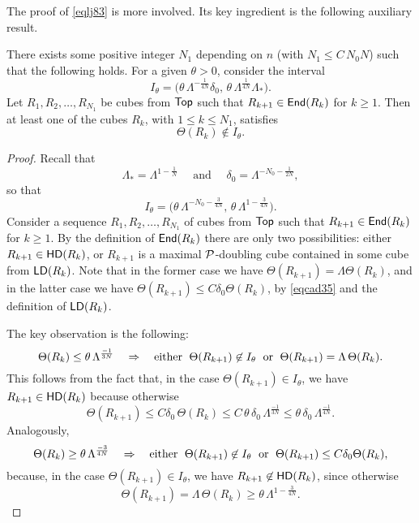 The proof of \eqref{eqlj83} is more involved. Its key ingredient is the following auxiliary result.

\begin{lemma}\label{lemtrucguai}
There exists some positive integer
$N_1$ depending on $n$ (with $N_1\leq C\,N_0 N$) such that the following holds.
For a given $\theta>0$, consider the interval
$$I_\theta = \big(\theta\,\Lambda^{-\frac1{4N}}\delta_0,\, \theta\,\Lambda^{\frac1{4N}}\Lambda_*\big).$$
Let $R_1,R_2,\ldots,R_{N_1}$ be cubes from ${\mathsf {Top}}$ such that $R_{k+1}\in{\mathsf{End}}(R_{k})$ for $k\geq1$. 
Then at least one of the cubes $R_k$, with $1\leq k\le N_1$, satisfies
$$\Theta(R_k)\not \in I_\theta.$$
\end{lemma}

\begin{proof}
Recall that
$$\Lambda_*= \Lambda^{1-\frac1N}\quad\mbox{ and }\quad\delta_0 = \Lambda^{-N_0 - \frac1{2N}},$$
so that
$$I_\theta = \big(\theta\,\Lambda^{-N_0-\frac3{4N}},\, \theta\,\Lambda^{1-\frac3{4N}}\big).$$
Consider a sequence $R_1,R_2,\ldots,R_{N_1}$ of cubes from ${\mathsf {Top}}$ such that $R_{k+1}\in{\mathsf{End}}(R_{k})$ for $k\geq1$. By the definition of ${\mathsf{End}}(R_k)$ there are only two possibilities: either $R_{k+1}\in{\mathsf{HD}}(R_k)$, or $R_{k+1}$ is a maximal ${\mathcal P}$-doubling cube contained in some cube from ${\mathsf{LD}}(R_k)$. Note that in the former case we have $\Theta(R_{k+1})=\Lambda\Theta(R_k)$, and in the latter case we have $\Theta(R_{k+1})\le C\delta_0\Theta(R_k)$, by \eqref{eqcad35} and the definition of ${\mathsf{LD}}(R_k)$.

The key observation is the following: 
\begin{equation}\label{eqsist1}
\Theta(R_k)\leq \theta\,\Lambda^{\frac{-1}{3N}} \quad \Rightarrow \quad \mbox{either \;$\Theta(R_{k+1})\not\in I_\theta$ \;or\;
$\Theta(R_{k+1})=\Lambda\,\Theta(R_k)$.}
\end{equation}
This follows from the fact that, in the case $\Theta(R_{k+1})\in I_\theta$, we have 
$R_{k+1}\in{\mathsf{HD}}(R_k)$ because otherwise 
$$\Theta(R_{k+1})\leq C\delta_0\,\Theta(R_k) \leq C\,\theta\,\delta_0\,\Lambda^{\frac{-1}{3N}}
\leq \theta\,\delta_0\,\Lambda^{\frac{-1}{4N}}
.$$
Analogously, 
\begin{equation}\label{eqsist2}
\Theta(R_k)\geq \theta\,\Lambda^{\frac{-3}{4N}} \quad \Rightarrow \quad \mbox{either \;$\Theta(R_{k+1})\not\in I_\theta$ \;or\;
$\Theta(R_{k+1})\leq C\delta_0\Theta(R_k)$,}
\end{equation}
because, in the case $\Theta(R_{k+1})\in I_\theta$, we have 
$R_{k+1}\not\in{\mathsf{HD}}(R_k)$,
since otherwise
$$\Theta(R_{k+1}) = \Lambda\,\Theta(R_k) \geq \theta\,\Lambda^{1-\frac3{4N}}
.$$


\end{proof}
